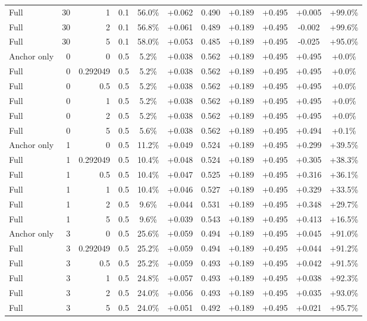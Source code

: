 \begin{table}[htbp]
\begin{tabular}{lrrrccccccc}
Full & 30 & 1 & 0.1 & 56.0\% & +0.062 & 0.490 & +0.189 & +0.495 & +0.005 & +99.0\% \\
Full & 30 & 2 & 0.1 & 56.8\% & +0.061 & 0.489 & +0.189 & +0.495 & -0.002 & +99.6\% \\
Full & 30 & 5 & 0.1 & 58.0\% & +0.053 & 0.485 & +0.189 & +0.495 & -0.025 & +95.0\% \\
Anchor only & 0 & 0 & 0.5 & 5.2\% & +0.038 & 0.562 & +0.189 & +0.495 & +0.495 & +0.0\% \\
Full & 0 & 0.292049 & 0.5 & 5.2\% & +0.038 & 0.562 & +0.189 & +0.495 & +0.495 & +0.0\% \\
Full & 0 & 0.5 & 0.5 & 5.2\% & +0.038 & 0.562 & +0.189 & +0.495 & +0.495 & +0.0\% \\
Full & 0 & 1 & 0.5 & 5.2\% & +0.038 & 0.562 & +0.189 & +0.495 & +0.495 & +0.0\% \\
Full & 0 & 2 & 0.5 & 5.2\% & +0.038 & 0.562 & +0.189 & +0.495 & +0.495 & +0.0\% \\
Full & 0 & 5 & 0.5 & 5.6\% & +0.038 & 0.562 & +0.189 & +0.495 & +0.494 & +0.1\% \\
Anchor only & 1 & 0 & 0.5 & 11.2\% & +0.049 & 0.524 & +0.189 & +0.495 & +0.299 & +39.5\% \\
Full & 1 & 0.292049 & 0.5 & 10.4\% & +0.048 & 0.524 & +0.189 & +0.495 & +0.305 & +38.3\% \\
Full & 1 & 0.5 & 0.5 & 10.4\% & +0.047 & 0.525 & +0.189 & +0.495 & +0.316 & +36.1\% \\
Full & 1 & 1 & 0.5 & 10.4\% & +0.046 & 0.527 & +0.189 & +0.495 & +0.329 & +33.5\% \\
Full & 1 & 2 & 0.5 & 9.6\% & +0.044 & 0.531 & +0.189 & +0.495 & +0.348 & +29.7\% \\
Full & 1 & 5 & 0.5 & 9.6\% & +0.039 & 0.543 & +0.189 & +0.495 & +0.413 & +16.5\% \\
Anchor only & 3 & 0 & 0.5 & 25.6\% & +0.059 & 0.494 & +0.189 & +0.495 & +0.045 & +91.0\% \\
Full & 3 & 0.292049 & 0.5 & 25.2\% & +0.059 & 0.494 & +0.189 & +0.495 & +0.044 & +91.2\% \\
Full & 3 & 0.5 & 0.5 & 25.2\% & +0.059 & 0.493 & +0.189 & +0.495 & +0.042 & +91.5\% \\
Full & 3 & 1 & 0.5 & 24.8\% & +0.057 & 0.493 & +0.189 & +0.495 & +0.038 & +92.3\% \\
Full & 3 & 2 & 0.5 & 24.0\% & +0.056 & 0.493 & +0.189 & +0.495 & +0.035 & +93.0\% \\
Full & 3 & 5 & 0.5 & 24.0\% & +0.051 & 0.492 & +0.189 & +0.495 & +0.021 & +95.7\% \\

\end{tabular}
\end{table}
